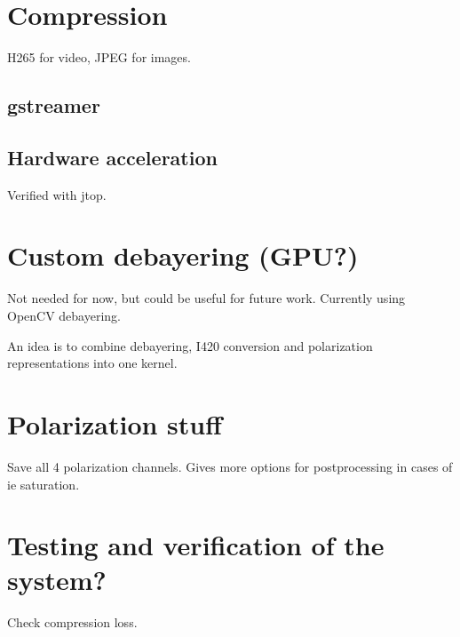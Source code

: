 \section{Compression}
H265 for video, JPEG for images.
\subsection*{gstreamer}
\subsection*{Hardware acceleration}
Verified with \gls{jtop}.

\section{Custom debayering (GPU?)}
Not needed for now, but could be useful for future work.
Currently using OpenCV debayering.

An idea is to combine debayering, I420 conversion and polarization representations into one kernel.

\section{Polarization stuff}
Save all 4 polarization channels.
Gives more options for postprocessing in cases of ie saturation.

\section{Testing and verification of the system?}
Check compression loss.

